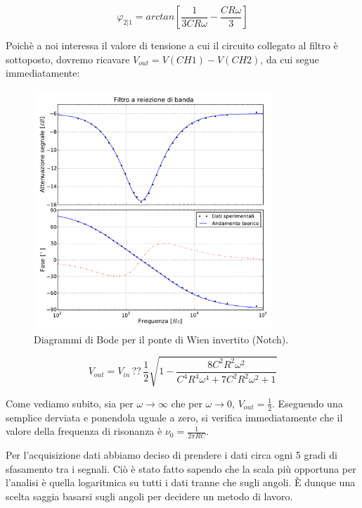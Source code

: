 \begin{equation}
\varphi_{2|1}=arctan[\frac{1}{3 C R \omega}-\frac{C R \omega}{3}]
\label{eq:F12}
\end{equation}

Poichè a noi interessa il valore di tensione a cui il circuito collegato al filtro è sottoposto, dovremo ricavare $V_{out}=V(CH1)-V(CH2)$, da cui segue immediatamente:

\begin{figure}
    \includegraphics[width=90mm]{notch2.pdf}
    \caption{Diagrammi di Bode per il ponte di Wien invertito \phantom {trollolollo} (Notch).}
    \label{fig:notch}
\end{figure}

\begin{equation}
V_{out}=V_{in} \,\textbf{??}\, \frac{1}{2} \sqrt{1-\frac{8 C^2 R^2 \omega^2}{C^4 R^4 \omega^4+7 C^2 R^2 \omega^2+1}}
\end{equation}


Come vediamo subito, sia per $\omega \rightarrow \infty$ che per $\omega \rightarrow 0$, $V_{out}=\frac{1}{2}$. Eseguendo una semplice derviata e ponendola uguale a zero, si verifica immediatamente che il valore della frequenza di risonanza è $\nu_0=\frac{1}{2 \pi R C}$.

Per l'acquisizione dati abbiamo deciso di prendere i dati circa ogni 5 gradi di sfasamento tra i segnali. Ciò è stato fatto sapendo che la scala più opportuna per l'analisi è quella logaritmica su tutti i dati tranne che sugli angoli. \`E dunque una scelta saggia basarsi sugli angoli per decidere un metodo di lavoro.


